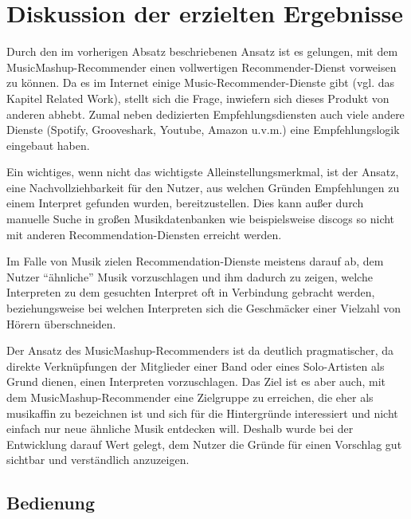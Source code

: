 \section{Diskussion der erzielten Ergebnisse}


Durch den im vorherigen Absatz beschriebenen Ansatz ist es gelungen, mit dem MusicMashup-Recommender einen vollwertigen Recommender-Dienst vorweisen zu können. Da es im Internet einige Music-Recommender-Dienste gibt (vgl. das Kapitel Related Work), stellt sich die Frage, inwiefern sich dieses Produkt von anderen abhebt. Zumal neben dedizierten Empfehlungsdiensten auch viele andere Dienste (Spotify, Grooveshark, Youtube, Amazon u.v.m.)  eine Empfehlungslogik eingebaut haben.

Ein wichtiges, wenn nicht das wichtigste Alleinstellungsmerkmal, ist der Ansatz, eine Nachvollziehbarkeit für den Nutzer, aus welchen Gründen Empfehlungen zu einem Interpret gefunden wurden, bereitzustellen. Dies kann außer durch manuelle Suche in großen Musikdatenbanken wie beispielsweise discogs so nicht mit anderen Recommendation-Diensten erreicht werden. %

Im Falle von Musik zielen Recommendation-Dienste meistens darauf ab, dem Nutzer “ähnliche” Musik vorzuschlagen und ihm dadurch zu zeigen, welche Interpreten zu dem gesuchten Interpret oft in Verbindung gebracht werden, beziehungsweise bei welchen Interpreten sich die Geschmäcker einer Vielzahl von Hörern überschneiden.

Der Ansatz des MusicMashup-Recommenders ist da deutlich pragmatischer, da direkte Verknüpfungen der Mitglieder einer Band oder eines Solo-Artisten als Grund dienen, einen Interpreten vorzuschlagen.
Das Ziel ist es aber auch, mit dem MusicMashup-Recommender eine Zielgruppe zu erreichen, die eher als musikaffin zu bezeichnen ist und sich für die Hintergründe interessiert und nicht einfach nur neue ähnliche Musik entdecken will. Deshalb wurde bei der Entwicklung darauf Wert gelegt, dem Nutzer die Gründe für einen Vorschlag gut sichtbar und verständlich anzuzeigen. %

\subsection{Bedienung}

